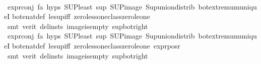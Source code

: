 \begin{isabellebody}
\isanewline
\ \ \ \ \ \ \isamarkupfalse%
\ {}\isanewline
\ \ \isamarkupfalse%
\ expr{\isacharunderscore}{\kern0pt}{}{\isacharunderscore}{\kern0pt}conj\ fa{\isacharunderscore}{\kern0pt}{\isasympsi}\ {\isachardoublequoteopen}{}{\isachardot}{\kern0pt}hyps{\isachardoublequoteclose}\ SUP{\isacharunderscore}{\kern0pt}least\ sup{\isacharunderscore}{\kern0pt}{\isasymphi}\ SUP{\isacharunderscore}{\kern0pt}image\ Sup{\isacharunderscore}{\kern0pt}union{\isacharunderscore}{\kern0pt}distrib\ bot{\isachardot}{\kern0pt}extremum{\isacharunderscore}{\kern0pt}uniqueI\isanewline
bot{\isacharunderscore}{\kern0pt}enat{\isacharunderscore}{\kern0pt}def\ le{\isacharunderscore}{\kern0pt}sup{\isacharunderscore}{\kern0pt}iff\ zero{\isacharunderscore}{\kern0pt}less{\isacharunderscore}{\kern0pt}one{\isacharunderscore}{\kern0pt}class{\isachardot}{\kern0pt}zero{\isacharunderscore}{\kern0pt}le{\isacharunderscore}{\kern0pt}one\isanewline
\ \ \isamarkupfalse%
\ {\isacharparenleft}{\kern0pt}smt\ {\isacharparenleft}{\kern0pt}verit{\isacharcomma}{\kern0pt}\ del{\isacharunderscore}{\kern0pt}insts{\isacharparenright}{\kern0pt}\ image{\isacharunderscore}{\kern0pt}is{\isacharunderscore}{\kern0pt}empty\ sup{\isacharunderscore}{\kern0pt}bot{\isacharunderscore}{\kern0pt}right{\isacharparenright}{\kern0pt}\isanewline
\ \ \ \ \isamarkupfalse%
\ {}\isanewline
{}\isamarkupfalse%
\ expr{\isacharunderscore}{\kern0pt}{}{\isacharunderscore}{\kern0pt}conj\ fa{\isacharunderscore}{\kern0pt}{\isasympsi}\ {\isachardoublequoteopen}{}{\isachardot}{\kern0pt}hyps{\isachardoublequoteclose}\ SUP{\isacharunderscore}{\kern0pt}least\ sup{\isacharunderscore}{\kern0pt}{\isasymphi}\ SUP{\isacharunderscore}{\kern0pt}image\ Sup{\isacharunderscore}{\kern0pt}union{\isacharunderscore}{\kern0pt}distrib\ bot{\isachardot}{\kern0pt}extremum{\isacharunderscore}{\kern0pt}uniqueI\isanewline
bot{\isacharunderscore}{\kern0pt}enat{\isacharunderscore}{\kern0pt}def\ le{\isacharunderscore}{\kern0pt}sup{\isacharunderscore}{\kern0pt}iff\ zero{\isacharunderscore}{\kern0pt}less{\isacharunderscore}{\kern0pt}one{\isacharunderscore}{\kern0pt}class{\isachardot}{\kern0pt}zero{\isacharunderscore}{\kern0pt}le{\isacharunderscore}{\kern0pt}one\ expr{\isacharunderscore}{\kern0pt}{}{\isacharunderscore}{\kern0pt}pos{\isacharunderscore}{\kern0pt}r\isanewline
\isanewline
\ \ \isamarkupfalse%
\ {\isacharparenleft}{\kern0pt}smt\ {\isacharparenleft}{\kern0pt}verit{\isacharcomma}{\kern0pt}\ del{\isacharunderscore}{\kern0pt}insts{\isacharparenright}{\kern0pt}\ image{\isacharunderscore}{\kern0pt}is{\isacharunderscore}{\kern0pt}empty\ sup{\isacharunderscore}{\kern0pt}bot{\isacharunderscore}{\kern0pt}right{\isacharparenright}{\kern0pt}\isanewline

\end{isabellebody}
